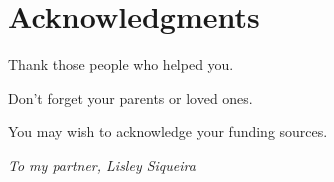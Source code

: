 
\chapter{Acknowledgments}

Thank those people who helped you. 

Don't forget your parents or loved ones.

You may wish to acknowledge your funding sources.



\clearpage

\thispagestyle{empty}
\vspace*{\fill}
\begin{flushright}
\emph{To my partner, Lisley Siqueira}
\end{flushright}
\vspace*{\fill}




\clearpage